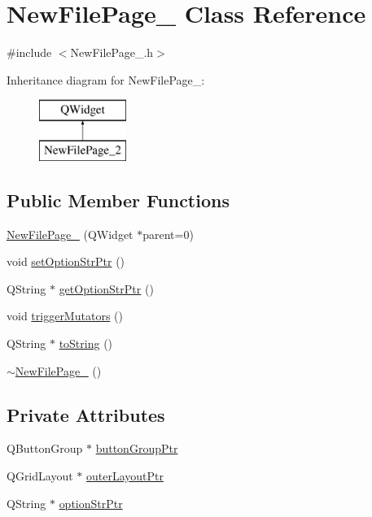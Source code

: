 \hypertarget{class_new_file_page__2}{\section{New\-File\-Page\-\_ Class Reference}
\label{class_new_file_page__2}
}


{\ttfamily \#include $<$New\-File\-Page\-\_.\-h$>$}

Inheritance diagram for New\-File\-Page\-\_\-:\begin{figure}[H]
\begin{center}
\leavevmode
\includegraphics[height=2.000000cm]{class_new_file_page__2}
\end{center}
\end{figure}
\subsection*{Public Member Functions}
\begin{DoxyCompactItemize}
\item 
\hyperlink{class_new_file_page__2_ae6158d1bf5b626cd19fd6060a22f8671}{New\-File\-Page\-\_} (Q\-Widget $\ast$parent=0)
\item 
void \hyperlink{class_new_file_page__2_ae67215e94650413f3a7d7bfa7da7d383}{set\-Option\-Str\-Ptr} ()
\item 
Q\-String $\ast$ \hyperlink{class_new_file_page__2_a7245ddb93d1dd167e331d11721a80b52}{get\-Option\-Str\-Ptr} ()
\item 
void \hyperlink{class_new_file_page__2_aa680bc4e087b98dbc1d69ee918a0cd24}{trigger\-Mutators} ()
\item 
Q\-String $\ast$ \hyperlink{class_new_file_page__2_a4a92aa5885c065bde1197568a82492e5}{to\-String} ()
\item 
\hyperlink{class_new_file_page__2_ada05f10017d64e57023cc2f1320ddb55}{$\sim$\-New\-File\-Page\-\_} ()
\end{DoxyCompactItemize}
\subsection*{Private Attributes}
\begin{DoxyCompactItemize}
\item 
Q\-Button\-Group $\ast$ \hyperlink{class_new_file_page__2_a1eaed1480c571a3bb321bc13707056c8}{button\-Group\-Ptr}
\item 
Q\-Grid\-Layout $\ast$ \hyperlink{class_new_file_page__2_aeebed0ee7d06690f79843b0b926e937c}{outer\-Layout\-Ptr}
\item 
Q\-String $\ast$ \hyperlink{class_new_file_page__2_a8be9fd0cc47bdaa93967f604d8ca081a}{option\-Str\-Ptr}
\end{DoxyCompactItemize}


